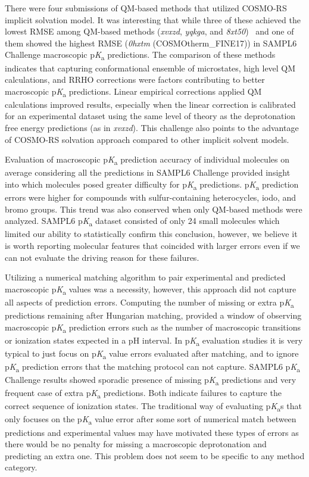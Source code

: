 \documentclass[9pt,lineno,final]{elife}
\newcommand{\pKa}{p\textit{K}\textsubscript{a}}
\begin{document}
There were four submissions of QM-based methods that utilized COSMO-RS implicit solvation model. 
It was interesting that while three of these achieved the lowest RMSE among QM-based methods (\textit{xvxzd}, \textit{yqkga}, and \textit{8xt50})~\citep{Pracht:2018:J.Comput.AidedMol.Des.} and one of them showed the highest RMSE (\textit{0hxtm} (COSMOtherm\_FINE17)) in SAMPL6 Challenge macroscopic \pKa{} predictions. The comparison of these methods indicates that capturing conformational ensemble of microstates, high level QM calculations, and RRHO corrections were factors contributing to better macroscopic \pKa{} predictions.
Linear empirical corrections applied QM calculations improved results, especially when the linear correction is calibrated for an experimental dataset using the same level of theory as the deprotonation free energy predictions (as in \textit{xvxzd}).
This challenge also points to the advantage of COSMO-RS solvation approach compared to other implicit solvent models.

Evaluation of macroscopic \pKa{} prediction accuracy of individual molecules on average considering all the predictions in SAMPL6 Challenge provided insight into which molecules posed greater difficulty for \pKa{} predictions.    \pKa{} prediction errors were higher for compounds with sulfur-containing heterocycles, iodo, and bromo groups. This trend was also conserved when only QM-based methods were analyzed. SAMPL6 \pKa{} dataset consisted of only 24 small molecules which limited our ability to statistically confirm this conclusion, however, we believe it is worth reporting molecular features that coincided with larger errors even if we can not evaluate the driving reason for these failures. 

Utilizing a numerical matching algorithm to pair experimental and predicted macroscopic \pKa{} values was a necessity, however, this approach did not capture all aspects of prediction errors. Computing the number of missing or extra \pKa{} predictions remaining after Hungarian matching, provided a window of observing macroscopic \pKa{} prediction errors such as the number of macroscopic transitions or ionization states expected in a pH interval. In \pKa{} evaluation studies it is very typical to just focus on \pKa{} value errors evaluated after matching, and to ignore \pKa{} prediction errors that the matching protocol can not capture. SAMPL6 \pKa{} Challenge results showed sporadic presence of missing \pKa{} predictions and very frequent case of extra \pKa{} predictions. Both indicate failures to capture the correct sequence of ionization states. The traditional way of evaluating \pKa{}s that only focuses on the \pKa{} value error after some sort of numerical match between predictions and experimental values may have motivated these types of errors as there would be no penalty for missing a macroscopic deprotonation and predicting an extra one. This problem does not seem to be specific to any method category.
\end{document}
